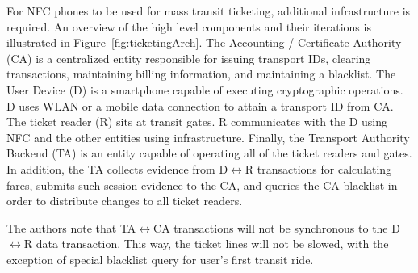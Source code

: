 \documentclass{sig-alternate}
\begin{document}
For NFC phones to be used for mass transit ticketing, additional infrastructure is required. An overview of the high level components and their iterations is illustrated in Figure~\ref{fig:ticketingArch}. The Accounting / Certificate Authority (CA) is a centralized entity responsible for issuing transport IDs, clearing transactions, maintaining billing information, and maintaining a blacklist. The User Device (D) is a smartphone capable of executing cryptographic operations. D uses WLAN or a mobile data connection to attain a transport ID from CA. The ticket reader (R) sits at transit gates. R communicates with the D using NFC and the other entities using infrastructure. Finally, the Transport Authority Backend (TA) is an entity capable of operating all of the ticket readers and gates. In addition, the TA collects evidence from D$\leftrightarrow$R transactions for calculating fares, submits such session evidence to the CA, and queries the CA blacklist in order to distribute changes to all ticket readers.

The authors note that TA$\leftrightarrow$CA transactions will not be synchronous to the D$\leftrightarrow$R data transaction. This way, the ticket lines will not be slowed, with the exception of special blacklist query for user's first transit ride.
\end{document}
